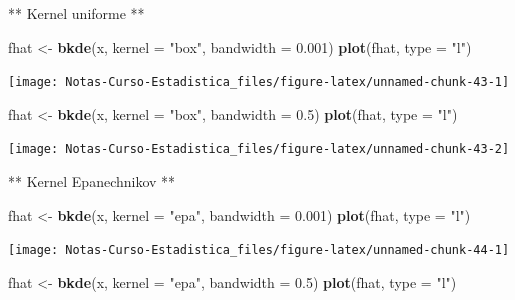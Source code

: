 \documentclass[
  12pt,
]{book}
\newenvironment{Shaded}{\begin{snugshade}}{\end{snugshade}}
\newcommand{\DataTypeTok}[1]{\textcolor[rgb]{0.13,0.29,0.53}{#1}}
\newcommand{\FloatTok}[1]{\textcolor[rgb]{0.00,0.00,0.81}{#1}}
\newcommand{\KeywordTok}[1]{\textcolor[rgb]{0.13,0.29,0.53}{\textbf{#1}}}
\newcommand{\NormalTok}[1]{#1}
\newcommand{\StringTok}[1]{\textcolor[rgb]{0.31,0.60,0.02}{#1}}
\theoremstyle{definition}
\theoremstyle{definition}
\theoremstyle{definition}
\theoremstyle{remark}
\begin{document}
** Kernel uniforme **

\begin{Shaded}
\begin{Highlighting}[]
\NormalTok{fhat <-}\StringTok{ }\KeywordTok{bkde}\NormalTok{(x, }\DataTypeTok{kernel =} \StringTok{"box"}\NormalTok{, }\DataTypeTok{bandwidth =} \FloatTok{0.001}\NormalTok{)}
\KeywordTok{plot}\NormalTok{(fhat, }\DataTypeTok{type =} \StringTok{"l"}\NormalTok{)}
\end{Highlighting}
\end{Shaded}

\begin{center}\texttt{[image: Notas-Curso-Estadistica\_files/figure-latex/unnamed-chunk-43-1]} \end{center}

\begin{Shaded}
\begin{Highlighting}[]
\NormalTok{fhat <-}\StringTok{ }\KeywordTok{bkde}\NormalTok{(x, }\DataTypeTok{kernel =} \StringTok{"box"}\NormalTok{, }\DataTypeTok{bandwidth =} \FloatTok{0.5}\NormalTok{)}
\KeywordTok{plot}\NormalTok{(fhat, }\DataTypeTok{type =} \StringTok{"l"}\NormalTok{)}
\end{Highlighting}
\end{Shaded}

\begin{center}\texttt{[image: Notas-Curso-Estadistica\_files/figure-latex/unnamed-chunk-43-2]} \end{center}

** Kernel Epanechnikov **

\begin{Shaded}
\begin{Highlighting}[]
\NormalTok{fhat <-}\StringTok{ }\KeywordTok{bkde}\NormalTok{(x, }\DataTypeTok{kernel =} \StringTok{"epa"}\NormalTok{, }\DataTypeTok{bandwidth =} \FloatTok{0.001}\NormalTok{)}
\KeywordTok{plot}\NormalTok{(fhat, }\DataTypeTok{type =} \StringTok{"l"}\NormalTok{)}
\end{Highlighting}
\end{Shaded}

\begin{center}\texttt{[image: Notas-Curso-Estadistica\_files/figure-latex/unnamed-chunk-44-1]} \end{center}

\begin{Shaded}
\begin{Highlighting}[]
\NormalTok{fhat <-}\StringTok{ }\KeywordTok{bkde}\NormalTok{(x, }\DataTypeTok{kernel =} \StringTok{"epa"}\NormalTok{, }\DataTypeTok{bandwidth =} \FloatTok{0.5}\NormalTok{)}
\KeywordTok{plot}\NormalTok{(fhat, }\DataTypeTok{type =} \StringTok{"l"}\NormalTok{)}
\end{Highlighting}
\end{Shaded}
\end{document}
